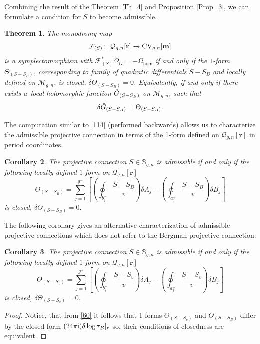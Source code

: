 \documentclass[pdftex]{sigma}
\numberwithin{equation}{section}
\newtheorem{Theorem}{Theorem}[section]
\newtheorem{Corollary}[Theorem]{Corollary}
\theoremstyle{definition}
\begin{document}
Combining the result of the Theorem \ref{Th_4} and Proposition \ref{Prop_3}, we can formulate a condition for $S$ to become admissible.
\begin{Theorem} \label{Th_5}
The monodromy map
\begin{equation*}%
\mathcal{F}_{(S)}\colon \ \mathcal{Q}_{g,n}[\mathbf{r}] \xrightarrow[]{} {\rm CV}_{g,n}[\mathbf{m}]\end{equation*}
is a symplectomorphism with $\mathcal{F}_{(S)}^*\Omega_G=-\Omega_{\hom}$
 if and only if the $1$-form $\Theta_{(S-S_B)}$, corresponding to family of quadratic differentials $S-S_B$ and locally defined on $\mathcal{M}_{g,n}$,
is closed, $\delta\Theta_{(S-S_B)}=0$. Equivalently, if and only if there exists a~local holomorphic function $\Hat{G}_{(S-S_B)}$ on $\mathcal{M}_{g,n}$, such that%
\begin{equation}\label{134}
\delta\Hat{G}_{(S-S_B)}=\Theta_{(S-S_B)}.
\end{equation}
\end{Theorem}

The computation similar to \eqref{114} (performed backwards) allows us to characterize the admissible projective connection in terms of the 1-form defined on $\mathcal{Q}_{g,n}[\mathbf{r}]$ in period coordinates.

\begin{Corollary}
The projective connection $S \in \mathbb{S}_{g,n}$ is admissible if and only if the following locally defined $1$-form on $\mathcal{Q}_{g,n}[\mathbf{r}]$
\begin{equation*}
\Theta_{(S-S_B)}=\sum^{g^-}_{j=1} \left [ \left(\oint_{b^-_j}\frac{S-S_B}{v} \right)\delta A_j - \left(\oint_{a^-_j}\frac{S-S_B}{v} \right)\delta B_j \right]
\end{equation*}
is closed, $\delta\Theta_{(S-S_B)}=0.$
\end{Corollary}

The following corollary gives an alternative characterization of admissible projective connections which
does not refer to the Bergman projective connection:

\begin{Corollary}The projective connection $S \in \mathbb{S}_{g,n}$ is admissible if and only if the following locally defined $1$-form on $\mathcal{Q}_{g,n}[\mathbf{r}]$
\begin{equation*}
\Theta_{(S-S_v)}=\sum^{g^-}_{j=1} \left[ \left(\oint_{b^-_j}\frac{S-S_v}{v} \right)\delta A_j - \left(\oint_{a^-_j}\frac{S-S_v}{v} \right)\delta B_j \right]
\end{equation*}
is closed, $\delta\Theta_{(S-S_v)}=0.$
\end{Corollary}
\begin{proof}
Notice, that from \eqref{60} it follows that 1-forms
$\Theta_{(S-S_v)}$ and $\Theta_{(S-S_B)}$ differ by the closed form $(24 \pi {\rm i})\delta \log \tau_B |_r$
so, their conditions of closedness are equivalent.
\end{proof}
\end{document}
